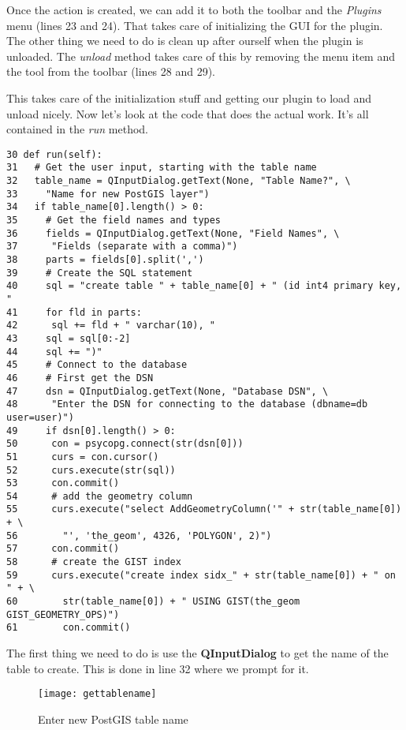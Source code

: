 Once the action is created, we can add it to both the toolbar and the
\textsl{Plugins} menu (lines 23 and 24).
That takes care of initializing the GUI for the plugin. The other thing we 
need to do is clean up after ourself when the plugin is unloaded. The 
\textsl{unload} method takes care of this by removing
the menu item and the tool from the toolbar (lines 28 and 29).

This takes care of the initialization stuff and getting our plugin to load
and unload nicely. Now let's look at the code that does the actual work.
It's all contained in the \textsl{run} method.

\begin{verbatim}
30 def run(self): 
31   # Get the user input, starting with the table name
32   table_name = QInputDialog.getText(None, "Table Name?", \
33     "Name for new PostGIS layer")
34   if table_name[0].length() > 0:
35     # Get the field names and types
36     fields = QInputDialog.getText(None, "Field Names", \
37      "Fields (separate with a comma)")
38     parts = fields[0].split(',')
39     # Create the SQL statement
40     sql = "create table " + table_name[0] + " (id int4 primary key, "
41     for fld in parts:
42      sql += fld + " varchar(10), "
43     sql = sql[0:-2]
44     sql += ")"
45     # Connect to the database
46     # First get the DSN
47     dsn = QInputDialog.getText(None, "Database DSN", \
48      "Enter the DSN for connecting to the database (dbname=db user=user)")
49     if dsn[0].length() > 0:
50      con = psycopg.connect(str(dsn[0]))
51      curs = con.cursor()
52      curs.execute(str(sql))
53      con.commit()
54      # add the geometry column
55      curs.execute("select AddGeometryColumn('" + str(table_name[0]) + \
56        "', 'the_geom', 4326, 'POLYGON', 2)")
57      con.commit()
58      # create the GIST index
59      curs.execute("create index sidx_" + str(table_name[0]) + " on " + \
60        str(table_name[0]) + " USING GIST(the_geom GIST_GEOMETRY_OPS)")
61        con.commit()
\end{verbatim}

The first thing we need to do is use the \textbf{QInputDialog} to get the 
name of the table to create. This is done in line 32 where we prompt for it.

\begin{figure}[ht]
\begin{center}
  \caption{Enter new PostGIS table name}\label{fig:gettablename}\smallskip
  \texttt{[image: gettablename]}
\end{center}
\end{figure}

